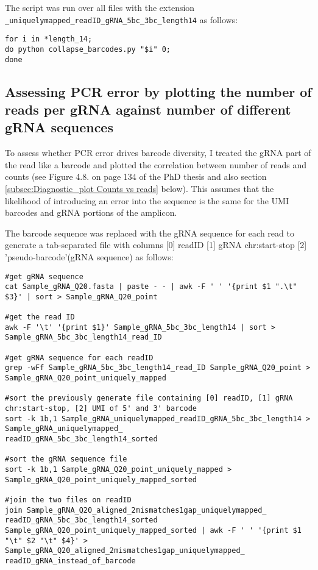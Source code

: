 The script was run over all files with the extension \verb|_uniquelymapped_readID_gRNA_5bc_3bc_length14| as follows:

\begin{lstlisting}
for i in *length_14;
do python collapse_barcodes.py "$i" 0;
done
\end{lstlisting}


\subsection{Assessing PCR error by plotting the number of reads per gRNA against number of different gRNA sequences}

To assess whether PCR error drives barcode diversity, I treated the gRNA part of the read like a barcode and plotted the correlation between number of reads and counts (see Figure 4.8. on page 134 of the PhD thesis and also section  \ref{subsec:Diagnostic_plot Counts vs reads} below). This assumes that the likelihood of introducing an error into the sequence is the same for the UMI barcodes and gRNA portions of the amplicon.

The barcode sequence was replaced with the gRNA sequence for each read to generate a tab-separated file with columns [0] readID [1] gRNA chr:start-stop [2] 'pseudo-barcode'(gRNA sequence) as follows:

\begin{lstlisting}
#get gRNA sequence 
cat Sample_gRNA_Q20.fasta | paste - - | awk -F ' ' '{print $1 ".\t" $3}' | sort > Sample_gRNA_Q20_point

#get the read ID
awk -F '\t' '{print $1}' Sample_gRNA_5bc_3bc_length14 | sort > Sample_gRNA_5bc_3bc_length14_read_ID

#get gRNA sequence for each readID
grep -wFf Sample_gRNA_5bc_3bc_length14_read_ID Sample_gRNA_Q20_point > Sample_gRNA_Q20_point_uniquely_mapped

#sort the previously generate file containing [0] readID, [1] gRNA chr:start-stop, [2] UMI of 5' and 3' barcode
sort -k 1b,1 Sample_gRNA_uniquelymapped_readID_gRNA_5bc_3bc_length14 > Sample_gRNA_uniquelymapped_
readID_gRNA_5bc_3bc_length14_sorted

#sort the gRNA sequence file
sort -k 1b,1 Sample_gRNA_Q20_point_uniquely_mapped > Sample_gRNA_Q20_point_uniquely_mapped_sorted

#join the two files on readID
join Sample_gRNA_Q20_aligned_2mismatches1gap_uniquelymapped_
readID_gRNA_5bc_3bc_length14_sorted Sample_gRNA_Q20_point_uniquely_mapped_sorted | awk -F ' ' '{print $1 "\t" $2 "\t" $4}' > Sample_gRNA_Q20_aligned_2mismatches1gap_uniquelymapped_
readID_gRNA_instead_of_barcode
\end{lstlisting}

